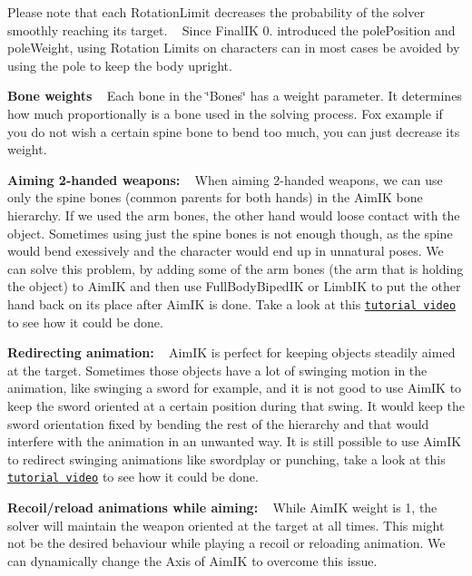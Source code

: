 Please note that each Rotation\+Limit decreases the probability of the solver smoothly reaching it\textquotesingle{}s target. ~\newline
 Since Final\+IK 0. introduced the pole\+Position and pole\+Weight, using Rotation Limits on characters can in most cases be avoided by using the pole to keep the body upright.

{\bfseries Bone weights} ~\newline
 Each bone in the \char`\"{}\+Bones\char`\"{} has a weight parameter. It determines how much proportionally is a bone used in the solving process. Fox example if you do not wish a certain spine bone to bend too much, you can just decrease it\textquotesingle{}s weight.

{\bfseries Aiming 2-\/handed weapons\+:} ~\newline
 When aiming 2-\/handed weapons, we can use only the spine bones (common parents for both hands) in the Aim\+IK bone hierarchy. If we used the arm bones, the other hand would loose contact with the object. Sometimes using just the spine bones is not enough though, as the spine would bend exessively and the character would end up in unnatural poses. We can solve this problem, by adding some of the arm bones (the arm that is holding the object) to Aim\+IK and then use Full\+Body\+Biped\+IK or Limb\+IK to put the other hand back on its place after Aim\+IK is done. Take a look at this \href{https://www.youtube.com/watch?v=5DlTjasmTLk}{\tt tutorial video} to see how it could be done.

{\bfseries Redirecting animation\+:} ~\newline
 Aim\+IK is perfect for keeping objects steadily aimed at the target. Sometimes those objects have a lot of swinging motion in the animation, like swinging a sword for example, and it is not good to use Aim\+IK to keep the sword oriented at a certain position during that swing. It would keep the sword orientation fixed by bending the rest of the hierarchy and that would interfere with the animation in an unwanted way. It is still possible to use Aim\+IK to redirect swinging animations like swordplay or punching, take a look at this \href{https://www.youtube.com/watch?v=OhCtiV5r8HA}{\tt tutorial video} to see how it could be done.

{\bfseries Recoil/reload animations while aiming\+:} ~\newline
 While Aim\+IK weight is 1, the solver will maintain the weapon oriented at the target at all times. This might not be the desired behaviour while playing a recoil or reloading animation. We can dynamically change the Axis of Aim\+IK to overcome this issue.


